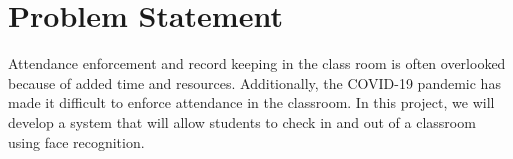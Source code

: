 \section{Problem Statement}
\label{sec:problem}
Attendance enforcement and record keeping in the class room is often overlooked because of added time and resources. Additionally, the COVID-19 pandemic has made it difficult to enforce attendance in the classroom. In this project, we will develop a system that will allow students to check in and out of a classroom using face recognition. \\
